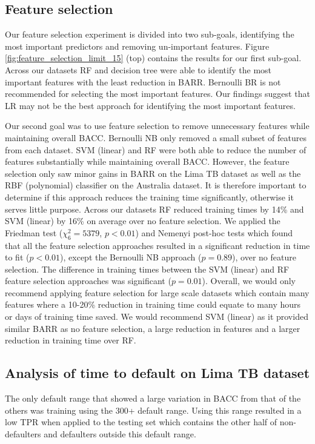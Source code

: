 \documentclass{sig-alternate-05-2015}
\begin{document}
	
	\subsection{Feature selection}
	Our feature selection experiment is divided into two sub-goals, identifying the most important predictors and removing un-important features. Figure \ref{fig:feature_selection_limit_15} (top) contains the results for our first sub-goal. Across our datasets RF and decision tree were able to identify the most important features with the least reduction in BARR. Bernoulli BR is not recommended for selecting the most important features. Our findings suggest that LR may not be the best approach for identifying the most important features.
	
	Our second goal was to use feature selection to remove unnecessary features while maintaining overall BACC. Bernoulli NB only removed a small subset of features from each dataset. SVM (linear) and RF were both able to reduce the number of features substantially while maintaining overall BACC. However, the feature selection only saw minor gains in BARR on the Lima TB dataset as well as the RBF (polynomial) classifier on the Australia dataset. It is therefore important to determine if this approach reduces the training time significantly, otherwise it serves little purpose. Across our datasets RF reduced training times by 14\% and SVM (linear) by 16\% on average over no feature selection. We applied the Friedman test ($\chi^2_{6}=5379$, $p<0.01$) and Nemenyi post-hoc tests which found that all the feature selection approaches resulted in a significant reduction in time to fit ($p<0.01$), except the Bernoulli NB approach ($p=0.89$), over no feature selection. The difference in training times between the SVM (linear) and RF feature selection approaches was significant ($p=0.01$). Overall, we would only recommend applying feature selection for large scale datasets which contain many features where a 10-20\% reduction in training time could equate to many hours or days of training time saved. We would recommend SVM (linear) as it provided similar BARR as no feature selection, a large reduction in features and a larger reduction in training time over RF.

	
	\subsection{Analysis of time to default on Lima TB dataset}
	The only default range that showed a large variation in BACC from that of the others was training using the 300+ default range. Using this range resulted in a low TPR when applied to the testing set which contains the other half of non-defaulters and defaulters outside this default range. 
	
\end{document}
